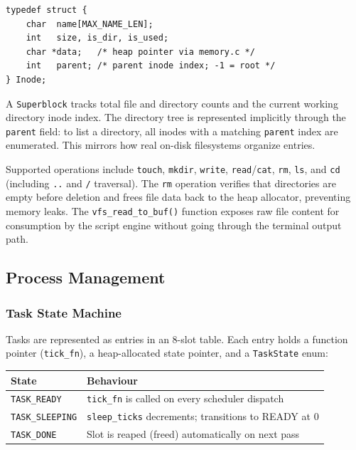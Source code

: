 \documentclass[conference]{IEEEtran}
\begin{document}
\begin{verbatim}
typedef struct {
    char  name[MAX_NAME_LEN];
    int   size, is_dir, is_used;
    char *data;   /* heap pointer via memory.c */
    int   parent; /* parent inode index; -1 = root */
} Inode;
\end{verbatim}

A \texttt{Superblock} tracks total file and directory counts and the current working directory inode index. The directory tree is represented implicitly through the \texttt{parent} field: to list a directory, all inodes with a matching \texttt{parent} index are enumerated. This mirrors how real on-disk filesystems organize entries.

Supported operations include \texttt{touch}, \texttt{mkdir}, \texttt{write}, \texttt{read}/\texttt{cat}, \texttt{rm}, \texttt{ls}, and \texttt{cd} (including \texttt{..} and \texttt{/} traversal). The \texttt{rm} operation verifies that directories are empty before deletion and frees file data back to the heap allocator, preventing memory leaks. The \texttt{vfs\_read\_to\_buf()} function exposes raw file content for consumption by the script engine without going through the terminal output path.

\subsection{Process Management}

\subsubsection{Task State Machine}

Tasks are represented as entries in an 8-slot table. Each entry holds a function pointer (\texttt{tick\_fn}), a heap-allocated state pointer, and a \texttt{TaskState} enum:

\begin{center}
\begin{tabular}{ll}
\toprule
\textbf{State} & \textbf{Behaviour} \\
\midrule
\texttt{TASK\_READY}    & \texttt{tick\_fn} is called on every scheduler dispatch \\
\texttt{TASK\_SLEEPING} & \texttt{sleep\_ticks} decrements; transitions to READY at 0 \\
\texttt{TASK\_DONE}     & Slot is reaped (freed) automatically on next pass \\
\bottomrule
\end{tabular}
\end{center}
\end{document}

